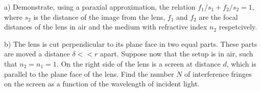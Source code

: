\documentclass{article}
\newcommand{\<}{\langle}
\renewcommand{\>}{\rangle}
\begin{document}
a) Demonstrate, using a paraxial approximation, the relation $f_1 / s_1 + f_2 / s_2 = 1$, where $s_2$ is the distance of the image from the lens, $f_1$ and $f_2$ are the focal distances of the lens in air and the medium with refractive index $n_2$ respetcively.

b) The lens is cut perpendicular to its plane face in two equal parts. These parts are moved a distance $\delta << r$ apart. Suppose now that the setup is in air, such that $n_2 = n_1 = 1$. On the right side of the lens is a screen at distance $d$, which is parallel to the plane face of the lens. Find the number $N$ of interference fringes on the screen as a function of the wavelength of incident light.
\end{document}

